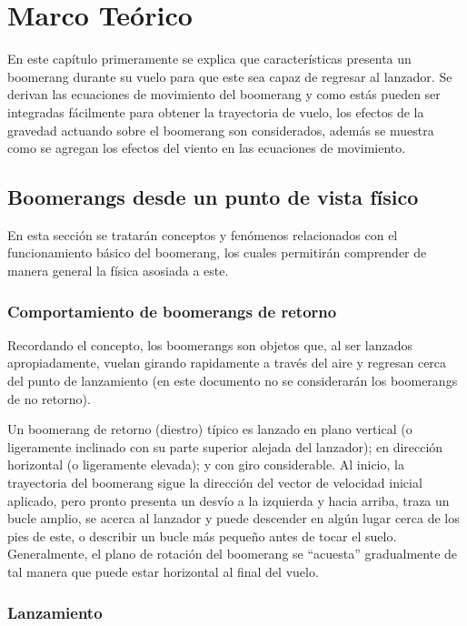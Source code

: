 \section{Marco Teórico}

	En este capítulo primeramente se explica que características presenta un boomerang durante su vuelo para que este sea capaz de regresar al lanzador. Se derivan las ecuaciones de movimiento del boomerang y como estás pueden ser integradas fácilmente para obtener la trayectoria de vuelo, los efectos de la gravedad actuando sobre el boomerang son considerados, además se muestra como se agregan los efectos del viento en las ecuaciones de movimiento.

	\subsection{Boomerangs desde un punto de vista físico}

	En esta sección se tratarán conceptos y fenómenos relacionados con el funcionamiento básico del boomerang, los cuales permitirán comprender de manera general la física asosiada a este.

		\subsubsection{Comportamiento de boomerangs de retorno}

	Recordando el concepto, los boomerangs son objetos que, al ser lanzados apropiadamente, vuelan girando rapidamente a través del aire y regresan cerca del punto de lanzamiento \cite{Hess1975} (en este documento no se considerarán los boomerangs de no retorno).

	Un boomerang de retorno (diestro) típico es lanzado en plano vertical (o ligeramente inclinado con su parte superior alejada del lanzador); en dirección horizontal (o ligeramente elevada); y con giro considerable. Al inicio, la trayectoria del boomerang sigue la dirección del vector de velocidad inicial aplicado, pero pronto presenta un desvío a la izquierda y hacia arriba, traza un bucle amplio, se acerca al lanzador y puede descender en algún lugar cerca de los pies de este, o describir un bucle más pequeño antes de tocar el suelo. Generalmente, el plano de rotación del boomerang se ``acuesta'' gradualmente de tal manera que puede estar horizontal al final del vuelo.

		\subsubsection{Lanzamiento}

